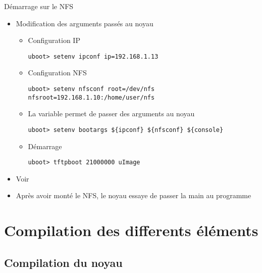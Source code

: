 \begin{frame}[fragile=singleslide]{Démarrage sur le NFS}
  \begin{itemize}
  \item Modification des arguments passés au noyau
    \begin{itemize}
    \item Configuration IP
      \begin{lstlisting}
uboot> setenv ipconf ip=192.168.1.13
      \end{lstlisting}
    \item Configuration NFS
      \begin{lstlisting}
uboot> setenv nfsconf root=/dev/nfs nfsroot=192.168.1.10:/home/user/nfs
      \end{lstlisting}
    \item La variable  permet de passer des arguments au noyau
      \begin{lstlisting}
uboot> setenv bootargs ${ipconf} ${nfsconf} ${console}
      \end{lstlisting}
    \item Démarrage
      \begin{lstlisting}
uboot> tftpboot 21000000 uImage
      \end{lstlisting}
    \end{itemize}
  \item Voir 
  \item Après avoir monté le NFS, le noyau essaye de passer la main au
    programme 
  \end{itemize}
\end{frame}

\section{Compilation des differents éléments}

\subsection{Compilation du noyau}

